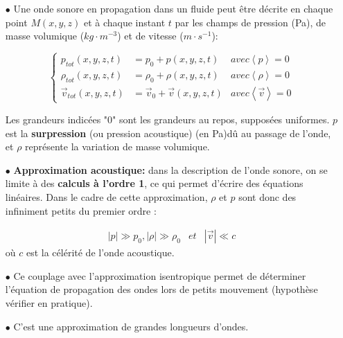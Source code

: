 \documentclass[a4paper]{article}
\begin{document}
\begin{itemize}
\item[$\bullet$] Une onde sonore en propagation dans un fluide peut être décrite en chaque point $M(x,y,z)$ et à chaque instant $t$ par les champs de pression (Pa), de masse volumique ($kg\cdot m^{-3}$) et de vitesse ($m\cdot s^{-1}$):

\begin{displaymath}
\left\lbrace
\begin{array}{ccl}
p_{tot}(x,y,z,t) & =  p_{0}+p(x,y,z,t) & avec  \left\langle p\right\rangle = 0 \\ 
\rho_{tot}(x,y,z,t) & =  \rho_{0}+\rho(x,y,z,t) & avec  \left\langle \rho\right\rangle = 0 \\
\overrightarrow{v}_{tot}(x,y,z,t) & = \overrightarrow{v}_{0}+\overrightarrow{v}(x,y,z,t) & avec \left\langle \overrightarrow{v}\right\rangle = 0
\end{array}\right.
\end{displaymath}

Les grandeurs indicées "$0$" sont les grandeurs au repos, supposées uniformes. 
$p$ est la \textbf{surpression} (ou pression acoustique) (en Pa)dû au passage de l'onde, et $\rho$ représente la variation de masse volumique.

\vspace{2mm}

\item[$\bullet$] \textbf{Approximation acoustique:} dans la description de l'onde sonore, on se limite à des \textbf{calculs à l'ordre 1}, ce qui permet d'écrire des équations linéaires. Dans le cadre de cette approximation, $\rho$ et $p$ sont donc des infiniment petits du premier ordre : 

\begin{displaymath}\begin{array}{ccc}
\left|p\right|\gg p_{0}, \left|\rho\right|\gg\rho_{0} & et & \left|\overrightarrow{v}\right|\ll c
\end{array}
\end{displaymath}
où $c$ est la célérité de l'onde acoustique.

\item[$\bullet$] Ce couplage avec l'approximation isentropique permet de déterminer l'équation de propagation des ondes lors de petits mouvement (hypothèse vérifier en pratique).

\item[$\bullet$] C'est une approximation de grandes longueurs d'ondes.
\end{itemize}
\end{document}

